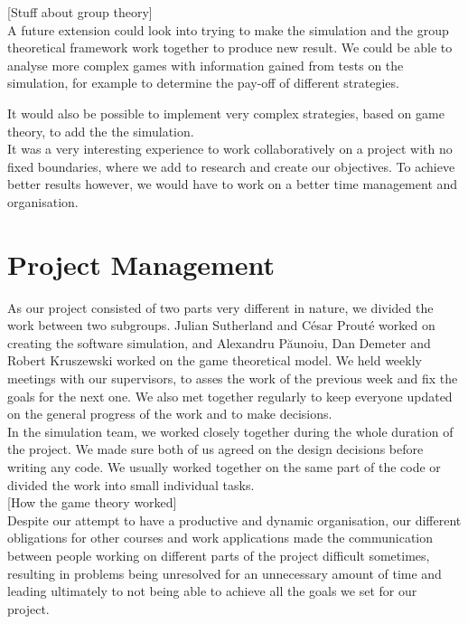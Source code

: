 \documentclass[10pt, a4paper]{report}
\begin{document}
[Stuff about group theory] \\

A future extension could look into trying to make the simulation and the group theoretical framework work together to produce new result. We could be able to analyse more complex games with information gained from tests on the simulation, for example to determine the pay-off of different strategies.

It would also be possible to implement very complex strategies, based on game theory, to add the the simulation. \\

It was a very interesting experience to work collaboratively on a project with no fixed boundaries, where we add to research and create our objectives. To achieve better results however, we would have to work on a better time management and organisation.


\chapter{Project Management}\label{ch:projmanag}

As our project consisted of two parts very different in nature, we divided the work between two subgroups. Julian Sutherland and C\'{e}sar Prout\'{e} worked on creating the software simulation, and Alexandru P\u{a}unoiu, Dan Demeter and Robert Kruszewski worked on the game theoretical model. We held weekly meetings with our supervisors, to asses the work of the previous week and fix the goals for the next one. We also met together regularly to keep everyone updated on the general progress of the work and to make decisions. \\

In the simulation team, we worked closely together during the whole duration of the project. We made sure both of us agreed on the design decisions before writing any code. We usually worked together on the same part of the code or divided the work into small individual tasks. \\

[How the game theory worked] \\

Despite our attempt to have a productive and dynamic organisation, our different obligations for other courses and work applications made the communication between people working on different parts of the project difficult sometimes, resulting in problems being unresolved for an unnecessary amount of time and leading ultimately to not being able to achieve all the goals we set for our project. \\




\end{document}
